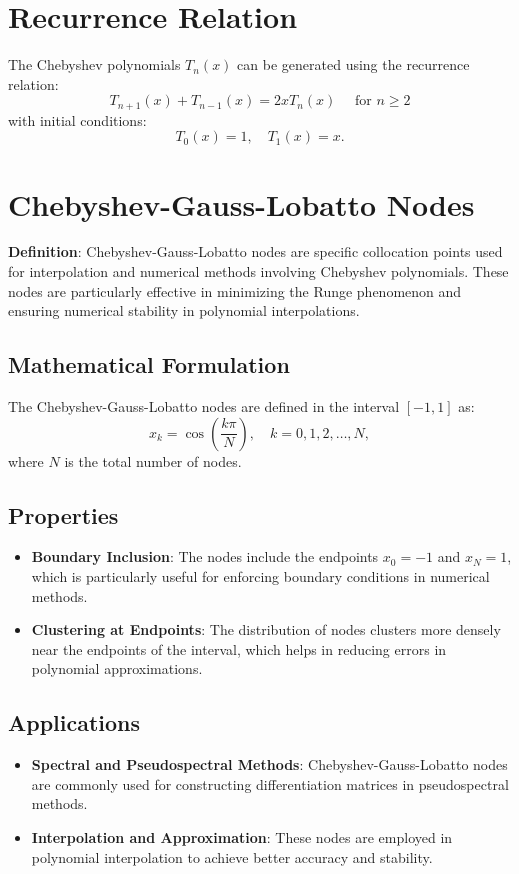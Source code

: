\documentclass[12pt]{report} %
\begin{document}
\section{Recurrence Relation}
The Chebyshev polynomials \( T_n(x) \) can be generated using the recurrence relation:
\[
T_{n+1}(x) + T_{n-1}(x) = 2x T_n(x) \quad  \text{ for } n \geq 2
\]
with initial conditions:
\[
T_0(x) = 1, \quad T_1(x) = x.
\]

\section{Chebyshev-Gauss-Lobatto Nodes}

\textbf{Definition}: Chebyshev-Gauss-Lobatto nodes are specific collocation points used for interpolation and numerical methods involving Chebyshev polynomials. These nodes are particularly effective in minimizing the Runge phenomenon and ensuring numerical stability in polynomial interpolations.

\subsection{Mathematical Formulation}
The Chebyshev-Gauss-Lobatto nodes are defined in the interval \( [-1, 1] \) as:
\[
x_k = \cos\left(\frac{k \pi}{N}\right), \quad k = 0, 1, 2, \dots, N,
\]
where \( N \) is the total number of nodes.

\subsection{Properties}
\begin{itemize}
    \item \textbf{Boundary Inclusion}: The nodes include the endpoints \( x_0 = -1 \) and \( x_N = 1 \), which is particularly useful for enforcing boundary conditions in numerical methods.
    \item \textbf{Clustering at Endpoints}: The distribution of nodes clusters more densely near the endpoints of the interval, which helps in reducing errors in polynomial approximations.
\end{itemize}

\subsection{Applications}
\begin{itemize}
    \item \textbf{Spectral and Pseudospectral Methods}: Chebyshev-Gauss-Lobatto nodes are commonly used for constructing differentiation matrices in pseudospectral methods.
    \item \textbf{Interpolation and Approximation}: These nodes are employed in polynomial interpolation to achieve better accuracy and stability.
\end{itemize}
\end{document}
